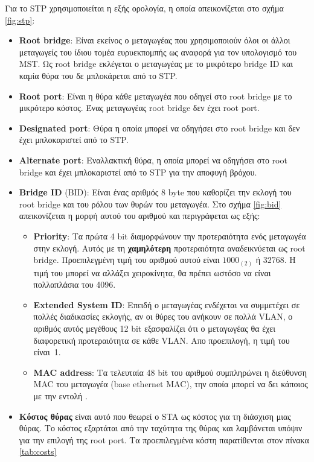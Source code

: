 \documentclass[eforms]{EdipyLabs} %
\begin{document}
Για το STP χρησιμοποιείται η εξής ορολογία, η οποία απεικονίζεται στο σχήμα \ref{fig:stp}:
\begin{itemize}
	\item \textbf{Root bridge}: Είναι εκείνος ο μεταγωγέας που χρησιμοποιούν όλοι οι άλλοι μεταγωγείς του ίδιου τομέα ευρυεκπομπής ως αναφορά για τον υπολογισμό του MST. Ως root bridge εκλέγεται ο μεταγωγέας με το μικρότερο bridge ID και καμία θύρα του δε μπλοκάρεται από το STP.
	\item \textbf{Root port}: Είναι η θύρα κάθε μεταγωγέα που οδηγεί στο root bridge με το μικρότερο κόστος. Ένας μεταγωγέας root bridge δεν έχει root port. 
	\item \textbf{Designated port}: Θύρα η οποία μπορεί να οδηγήσει στο root bridge και δεν έχει μπλοκαριστεί από το STP.
	\item \textbf{Alternate port}: Εναλλακτική θύρα, η οποία μπορεί να οδηγήσει στο root bridge και έχει μπλοκαριστεί από το STP για την αποφυγή βρόχου.  
	\item \textbf{Bridge ID} (BID): Είναι ένας αριθμός 8 byte που καθορίζει την εκλογή του root bridge και του ρόλου των θυρών του μεταγωγέα. Στο σχήμα \ref{fig:bid} απεικονίζεται η μορφή αυτού του αριθμού και περιγράφεται ως εξής:
	\begin{itemize}
		\item \textbf{Priority}: Τα πρώτα 4 bit διαμορφώνουν την προτεραιότητα ενός μεταγωγέα στην εκλογή. Αυτός με τη \textbf{χαμηλότερη} προτεραιότητα αναδεικνύεται ως root bridge. Προεπιλεγμένη τιμή του αριθμού αυτού είναι ${1000}_{(2)}$ ή $32768$. Η τιμή του μπορεί να αλλάξει χειροκίνητα, θα πρέπει ωστόσο να είναι πολλαπλάσια του 4096.
		\item \textbf{Extended System ID}: Επειδή ο μεταγωγέας ενδέχεται να συμμετέχει σε πολλές διαδικασίες εκλογής, αν οι θύρες του ανήκουν σε πολλά VLAN, ο αριθμός αυτός μεγέθους 12 bit εξασφαλίζει ότι ο μεταγωγέας θα έχει διαφορετική προτεραιότητα σε κάθε VLAN. Απο προεπιλογή, η τιμή του είναι~1.
		\item \textbf{MAC address}: Τα τελευταία 48 bit του αριθμού συμπληρώνει η διεύθυνση MAC του μεταγωγέα (base ethernet MAC), την οποία μπορεί να δει κάποιος με την εντολή .
	\end{itemize}
	\item \textbf{Κόστος θύρας} είναι αυτό που θεωρεί ο STA ως κόστος για τη διάσχιση μιας θύρας. Το κόστος εξαρτάται από την ταχύτητα της θύρας και λαμβάνεται υπόψιν για την επιλογή της root port. Τα προεπιλεγμένα κόστη παρατίθενται στον πίνακα \ref{tab:costs}

\end{itemize}
\end{document}
